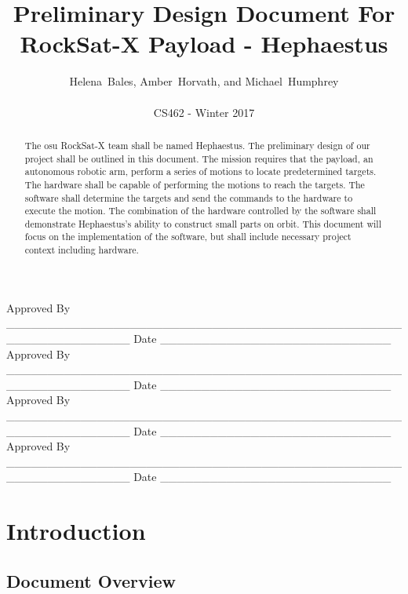 \documentclass[letterpaper,10pt]{article}
\title{Preliminary Design Document For RockSat-X Payload - Hephaestus}
\author{Helena~Bales, Amber~Horvath, and Michael~Humphrey\\ \\ CS462 - Winter 2017}
\newenvironment{bottompar}{\par\vspace*{\fill}}{\clearpage}
\begin{document}
\maketitle

\begin{abstract}
The \gls{osu} RockSat-X team shall be named Hephaestus.
The preliminary design of our project shall be outlined in this document.
The mission requires that the \gls{payload}, an autonomous robotic arm, perform a series of motions to locate predetermined targets.
The hardware shall be capable of performing the motions to reach the targets.
The software shall determine the targets and send the commands to the hardware to execute the motion.
The combination of the hardware controlled by the software shall demonstrate Hephaestus's ability to construct small parts on orbit.
This document will focus on the implementation of the software, but shall include necessary project context including hardware.
\end{abstract}

\begin{bottompar}
Approved By
\_\_\_\_\_\_\_\_\_\_\_\_\_\_\_\_\_\_\_\_\_\_\_\_\_\_\_\_\_\_\_\_\_\_\_\_\_\_\_\_\_\_\_\_\_\_\_\_\_\_\_\_\_\_\_\_\_\_\_\_\_\_\_
Date \_\_\_\_\_\_\_\_\_\_\_\_\_\_\_\_\_\_\_\_\_\_\_\_\_\_\_\_ \\


Approved By
\_\_\_\_\_\_\_\_\_\_\_\_\_\_\_\_\_\_\_\_\_\_\_\_\_\_\_\_\_\_\_\_\_\_\_\_\_\_\_\_\_\_\_\_\_\_\_\_\_\_\_\_\_\_\_\_\_\_\_\_\_\_\_
Date \_\_\_\_\_\_\_\_\_\_\_\_\_\_\_\_\_\_\_\_\_\_\_\_\_\_\_\_ \\


Approved By
\_\_\_\_\_\_\_\_\_\_\_\_\_\_\_\_\_\_\_\_\_\_\_\_\_\_\_\_\_\_\_\_\_\_\_\_\_\_\_\_\_\_\_\_\_\_\_\_\_\_\_\_\_\_\_\_\_\_\_\_\_\_\_
Date \_\_\_\_\_\_\_\_\_\_\_\_\_\_\_\_\_\_\_\_\_\_\_\_\_\_\_\_ \\


Approved By
\_\_\_\_\_\_\_\_\_\_\_\_\_\_\_\_\_\_\_\_\_\_\_\_\_\_\_\_\_\_\_\_\_\_\_\_\_\_\_\_\_\_\_\_\_\_\_\_\_\_\_\_\_\_\_\_\_\_\_\_\_\_\_
Date \_\_\_\_\_\_\_\_\_\_\_\_\_\_\_\_\_\_\_\_\_\_\_\_\_\_\_\_ \\
\end{bottompar}

\clearpage
\tableofcontents
\clearpage

\section{Introduction}
\subsection{Document Overview}
\end{document}

